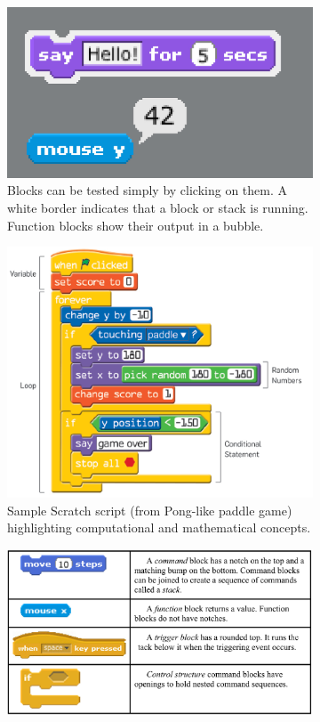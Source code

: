 \documentclass[runningheads,a4paper]{llncs}
\begin{document}
\begin{figure}[ht]
\centering
\begin{subfigure}[t]{0.45\textwidth}\centering\includegraphics[width=0.9\columnwidth]{images/ScratchLive.png}
\caption{Blocks can be tested simply by clicking on them. A white border indicates that a block or 
stack is running. Function blocks show their output in a  bubble.}\label{subfig:blocktest}\end{subfigure}
\hspace*{\fill}
\begin{subfigure}[t]{0.45\textwidth}\centering\includegraphics[width=0.9\columnwidth]{images/Snatch1.PNG}
\caption{Sample Scratch script (from Pong-like paddle game) highlighting computational and mathematical concepts.}\label{subfig:highlightconcepts}\end{subfigure}
\begin{subfigure}[t]{0.9\textwidth}\vspace{1cm}\centering\includegraphics[width=0.9\columnwidth]{images/ScratchBlockTypes.PNG}

\end{subfigure}
\end{figure}
\end{document}
